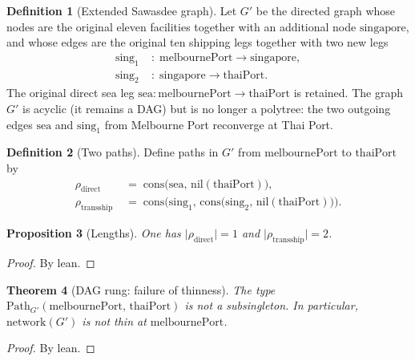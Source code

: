 \documentclass[11pt,a4paper]{article}
\theoremstyle{plain}
\newtheorem{theorem}{Theorem}[section]
\newtheorem{proposition}[theorem]{Proposition}
\theoremstyle{definition}
\newtheorem{definition}[theorem]{Definition}
\begin{document}
\begin{definition}[Extended Sawasdee graph]\label{def:G-prime}
Let $G'$ be the directed graph whose nodes are the original eleven facilities
together with an additional node $\mathrm{singapore}$, and whose edges are the
original ten shipping legs together with two new legs
\begin{align*}
  \mathrm{sing}_1 &\;:\; \mathrm{melbournePort} \to \mathrm{singapore}, \\
  \mathrm{sing}_2 &\;:\; \mathrm{singapore} \to \mathrm{thaiPort}.
\end{align*}
The original direct sea leg
$\mathrm{sea} : \mathrm{melbournePort} \to \mathrm{thaiPort}$ is retained. The
graph $G'$ is acyclic (it remains a DAG) but is no longer a polytree: the two
outgoing edges $\mathrm{sea}$ and $\mathrm{sing}_1$ from Melbourne Port reconverge
at Thai Port.
\end{definition}

\begin{definition}[Two paths]\label{def:two-paths}
Define paths in $G'$ from $\mathrm{melbournePort}$ to $\mathrm{thaiPort}$ by
\begin{align}
  \rho_{\mathrm{direct}}
  &\;=\;
  \mathrm{cons}\bigl(\mathrm{sea},\, \mathrm{nil}(\mathrm{thaiPort})\bigr),
  \\[4pt]
  \rho_{\mathrm{transship}}
  &\;=\;
  \mathrm{cons}\bigl(\mathrm{sing}_1,\,
    \mathrm{cons}\bigl(\mathrm{sing}_2,\,
      \mathrm{nil}(\mathrm{thaiPort})\bigr)\bigr).
\end{align}
\end{definition}

\begin{proposition}[Lengths]\label{prop:dag-lengths}
One has $\lvert\rho_{\mathrm{direct}}\rvert = 1$ and
$\lvert\rho_{\mathrm{transship}}\rvert = 2$.
\end{proposition}

\begin{proof}
By lean.
\end{proof}

\begin{theorem}[DAG rung: failure of thinness]\label{thm:dag-rung}
The type $\mathrm{Path}_{G'}(\mathrm{melbournePort},\, \mathrm{thaiPort})$ is
not a subsingleton. In particular, $\mathrm{network}(G')$ is not thin at
$\mathrm{melbournePort}$.
\end{theorem}

\begin{proof}
By lean.
\end{proof}
\end{document}
